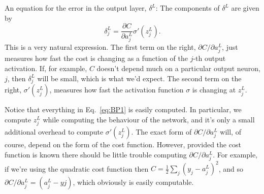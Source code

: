 \documentclass[a4paper,twoside,10pt]{book}
\begin{document}
An equation for the error in the output layer, $\delta^L$: The components of $\delta^L$ are given by
\begin{equation}
	\delta^L_j = \frac{\partial C}{\partial a^L_j} \sigma'(z^L_j).
	\tag{BP1}
	\label{eq:BP1}
\end{equation}
This is a very natural expression. The first term on the right, $\partial{}C/\partial{}a^L_j$, just measures how fast the cost is changing as a function of the $j$-th output activation. If, for example, $C$ doesn't depend much on a particular output neuron, $j$, then $\delta^L_j$ will be small, which is what we'd expect. The second term on the right, $\sigma'(z^L_j)$, measures how fast the activation function $\sigma$ is changing at $z^L_j$.

Notice that everything in Eq.~\ref{eq:BP1} is easily computed. In particular, we compute $z^L_j$ while computing the behaviour of the network, and it's only a small additional overhead to compute $\sigma'(z^L_j)$. The exact form of $\partial{}C/\partial{}a^L_j$ will, of course, depend on the form of the cost function. However, provided the cost function is known there should be little trouble computing $\partial{}C/\partial{}a^L_j$. For example, if we're using the quadratic cost function then $C=\frac12\sum_j(y_j−a^L_j)^2$, and so $\partial{}C/\partial{}a^L_j=(a^L_j−yj)$, which obviously is easily computable.
\end{document}
